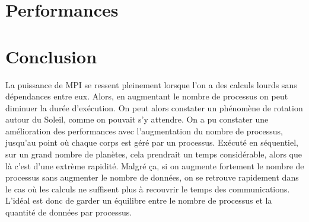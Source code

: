 \documentclass[a4paper,11pt]{article}
\begin{document}
 

\section{Performances}



\section{Conclusion}


La puissance de MPI se ressent pleinement lorsque l'on a des calculs lourds sans dépendances entre eux. Alors, en augmentant le nombre de processus on peut diminuer la durée d'exécution. On peut alors constater un phénomène de rotation autour du Soleil, comme on pouvait s'y attendre. On a pu constater une amélioration des performances avec l'augmentation du nombre de processus, jusqu'au point où chaque corps est géré par un processus. Exécuté en séquentiel, sur un grand nombre de planètes, cela prendrait un temps considérable, alors que là c'est d'une extrème rapidité. Malgré ça, si on augmente fortement le nombre de processus sans augmenter le nombre de données, on se retrouve rapidement dans le cas où les calculs ne suffisent plus à recouvrir le temps des communications. L'idéal est donc de garder un équilibre entre le nombre de processus et la quantité de données par processus.
\end{document}
